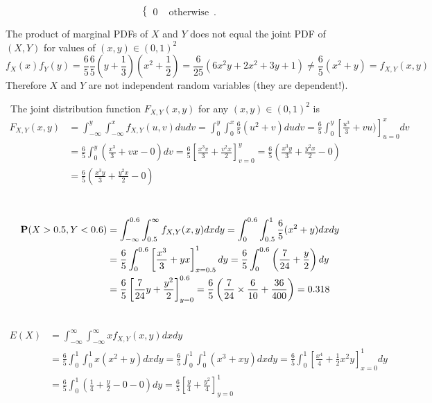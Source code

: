 \begin{ExerciseList}
\[\begin{cases}
0 & \text{ otherwise} \enspace .
\end{cases}
\]
\item The product of marginal PDFs of $X$ and $Y$ does not equal the joint PDF of $(X,Y)$ for values of $(x,y) \in (0,1)^2$
\[
f_X(x)f_Y(y) = \frac{6}{5} \frac{6}{5} \left( y + \frac{1}{3} \right) \left( x^2 + \frac{1}{2} \right) = \frac{6}{25} \left( 6 x^2y+2x^2+3y+1\right) \neq \frac{6}{5}(x^2+y) = f_{X,Y}(x,y)
\]
Therefore $X$ and $Y$ are not independent random variables (they are dependent!).
\item~The joint distribution function $F_{X,Y}(x,y)$ for any $(x,y) \in (0,1)^2$ is
\begin{align*}
F_{X,Y}(x,y) 
&= \int_{-\infty}^{y} \int_{-\infty}^{x} f_{X,Y}(u,v) du dv
= \int_{0}^{y} \int_{0}^{x} \frac{6}{5} (u^2+v) du dv
= \frac{6}{5} \int_{0}^{y} \left[ \frac{u^3}{3}+vu) \right]_{u=0}^{x} dv\\
&= \frac{6}{5} \int_{0}^{y} \left( \frac{x^3}{3}+vx - 0 \right) dv
= \frac{6}{5} \left[ \frac{x^3v}{3}+\frac{v^2x}{2} \right]_{v=0}^{y}
= \frac{6}{5} \left( \frac{x^3y}{3}+\frac{y^2x}{2} - 0 \right)\\
&= \frac{6}{5} \left( \frac{x^3y}{3}+\frac{y^2x}{2} - 0 \right)
\end{align*}
\item~
\begin{align*}
\mathbf{P}(X>0.5,Y<0.6) 
&= \int_{-\infty}^{0.6} \int_{0.5}^{\infty} f_{X,Y}(x,y) dx dy
= \int_{0}^{0.6} \int_{0.5}^{1} \frac{6}{5} (x^2+y) dx dy\\
&= \frac{6}{5} \int_{0}^{0.6} \left[ \frac{x^3}{3}+yx \right]_{x=0.5}^{1} dy
= \frac{6}{5} \int_{0}^{0.6} \left(\frac{7}{24} + \frac{y}{2} \right) dy\\
&= \frac{6}{5} \left[\frac{7}{24}y + \frac{y^2}{2} \right]_{y=0}^{0.6}
= \frac{6}{5} \left(\frac{7}{24}\times \frac{6}{10} + \frac{36}{400} \right)
=0.318
\end{align*}
\item~
\begin{align*}
E(X) 
&= \int_{-\infty}^{\infty} \int_{-\infty}^{\infty} x f_{X,Y}(x,y) dx dy\\
&=\frac{6}{5} \int_{0}^{1} \int_{0}^{1}  x \left( x^2 + y \right) dx dy
=\frac{6}{5} \int_{0}^{1} \int_{0}^{1}  \left( x^3 + xy \right) dx dy
= \frac{6}{5} \int_{0}^{1} \left[ \frac{x^4}{4} + \frac{1}{2}x^2y\right]_{x=0}^{1} dy\\
&=\frac{6}{5} \int_{0}^{1} \left( \frac{1}{4} + \frac{y}{2} - 0 - 0\right) dy
= \frac{6}{5} \left[ \frac{y}{4} + \frac{y^2}{4} \right]_{y=0}^{1} 

\end{align*}
\end{ExerciseList}
